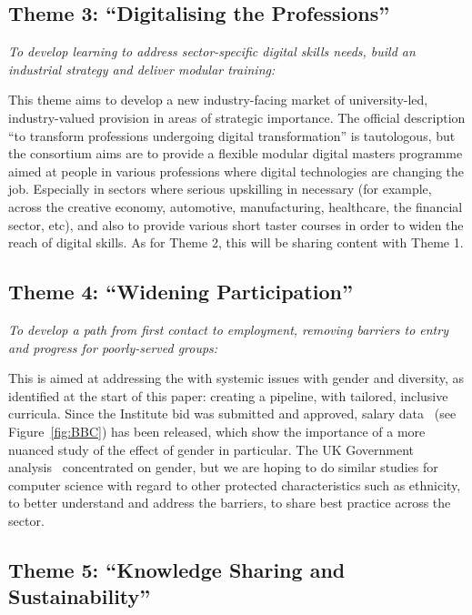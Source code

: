 \documentclass[conference]{IEEEtran}
\begin{document}
\subsection{Theme 3: ``Digitalising the Professions''}

{\emph{To develop learning to address sector-specific digital skills
needs, build an industrial strategy and deliver modular
training:}}\newline

\noindent This theme aims to develop a new industry-facing market of
university-led, industry-valued provision in areas of strategic
importance. The official description ``to transform professions
undergoing digital transformation'' \cite{DfE2018a} is tautologous,
but the consortium aims are to provide a flexible modular digital
masters programme aimed at people in various professions where digital
technologies are changing the job. Especially in sectors where serious
upskilling in necessary (for example, across the creative economy,
automotive, manufacturing, healthcare, the financial sector, etc), and
also to provide various short taster courses in order to widen the
reach of digital skills. As for Theme 2, this will be sharing content
with Theme 1.

\subsection{Theme 4: ``Widening Participation''}

{\emph{To develop a path from first contact to employment, removing
barriers to entry and progress for poorly-served groups:}}\newline

\noindent This is aimed at addressing the with systemic issues with
gender and diversity, as identified at the start of this paper:
creating a pipeline, with tailored, inclusive curricula. Since
the Institute bid was submitted and approved, salary
data~\cite{DfE2018d} (see Figure~\ref{fig:BBC}) has been released,
which show the importance of a more nuanced study of the effect of
gender in particular. The UK Government analysis~\cite{DfE2018d}
concentrated on gender, but we are hoping to do similar studies for
computer science with regard to other protected characteristics such
as ethnicity, to better understand and address the barriers, to share
best practice across the sector.

\subsection{Theme 5: ``Knowledge Sharing and Sustainability''}
\end{document}
